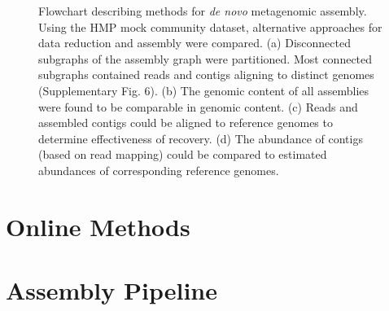 \documentclass{nature}%
\begin{document}
\newpage
\newpage

\begin{figure}[ht!]
\caption{Flowchart describing methods for \emph{de novo} metagenomic assembly.   Using the HMP
mock community dataset, alternative approaches for data reduction and assembly were compared.  
(a) Disconnected subgraphs of the assembly graph were partitioned.  Most connected subgraphs contained 
reads and contigs aligning to distinct genomes (Supplementary Fig. 6). (b) The genomic content of all assemblies were 
found to be comparable in genomic content.  (c)  Reads and assembled contigs could be aligned to reference 
genomes to determine effectiveness of recovery. (d) The abundance of contigs (based on read mapping) could 
be compared to estimated abundances of corresponding reference genomes.} 
\label{flowchart}
\end{figure}


\newpage

\newpage
\clearpage

\section*{Online Methods}

\section*{Assembly Pipeline}
\end{document}

